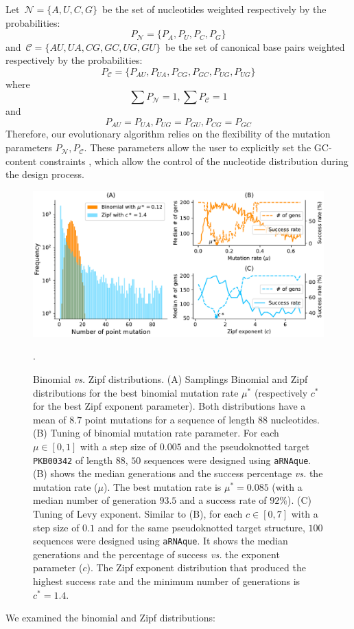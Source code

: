 Let~\(\mathcal{N}= \big \{ A, U, C, G \big \}\)~be the set of nucleotides weighted respectively by the probabilities:
\begin{equation*}
P_{\mathcal{N}} = \big \{ P_A, P_U, P_C, P_G \big\}
\end{equation*}
and~\(\mathcal{C} = \big \{ AU, UA, CG, GC, UG, GU\big \}\)~be the set of canonical base pairs weighted respectively by the probabilities:
\begin{equation*}
P_{\mathcal{C}} = \big \{P_{AU}, P_{UA},P_{CG},P_{GC},P_{UG},P_{UG} \big \} 
\end{equation*}
where
\begin{equation*}
\sum P_{\mathcal{N}} = 1, \sum P_{\mathcal{C}}  = 1 
\end{equation*}
and
\begin{equation*}
P_{AU} = P_{UA}, P_{UG} =P_{GU}, P_{CG} = P_{GC}
\end{equation*}
Therefore, our evolutionary algorithm relies on the flexibility of the mutation parameters $P_{\mathcal{N}}, P_{\mathcal{C}}$. These parameters allow the user to explicitly set the GC-content constraints , which allow the control of the nucleotide distribution during the design process.


\begin{figure}[ht]
	\includegraphics[width=1.0 \linewidth]{../res/images/arnaque/fig1.pdf}
	\caption{Binomial \emph{vs.} Zipf distributions. (A) Samplings Binomial and Zipf distributions for the best binomial mutation rate $\mu^*$ (respectively $c^*$ for the best Zipf exponent parameter). Both distributions have a mean of $8.7$ point mutations for a sequence of length $88$ nucleotides. (B) Tuning of binomial mutation rate parameter. For each $\mu \in [0,1]$ with a step size of $0.005$ and the pseudoknotted target \texttt{PKB00342} of length $88$, $50$ sequences were designed using \texttt{aRNAque}. (B) shows the median generations and the success percentage \emph{vs.} the mutation rate ($\mu$). The best mutation rate is $\mu^*=0.085$ (with a median number of generation $93.5$ and a success rate of $92\%$). (C) Tuning of Levy exponent. Similar to (B), for each $c \in [0,7]$ with a step size of $0.1$ and for the same pseudoknotted target structure, $100$ sequences were designed using \texttt{aRNAque}. It shows the median generations and the percentage of success \emph{vs.} the exponent parameter ($c$). The Zipf exponent distribution that produced the highest success rate and the minimum number of generations is $c^*=1.4$.}\label{Fig:histomut}. 
\end{figure}
 We examined the binomial and Zipf distributions:

